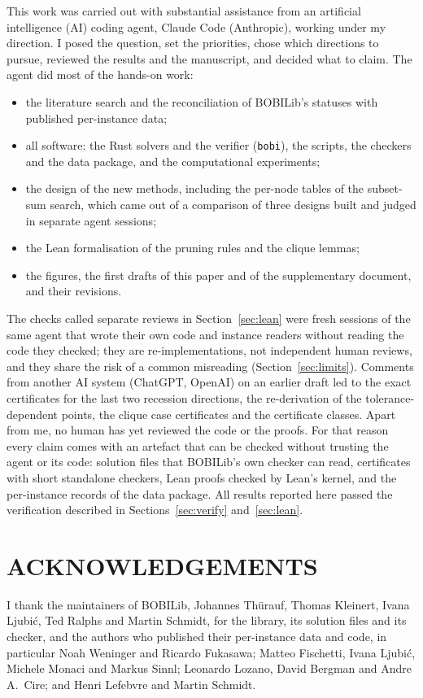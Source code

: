 \documentclass[]{spie}  %
\theoremstyle{plain}
\newcommand{\code}[1]{\texttt{#1}}
\begin{document}
This work was carried out with substantial assistance from an artificial intelligence (AI)
coding agent, Claude Code (Anthropic), working under my direction. I posed the question, set the
priorities, chose which directions to pursue, reviewed the results and the manuscript, and decided
what to claim. The agent did most of the hands-on work:
\begin{itemize}
\item the literature search and the reconciliation of BOBILib's statuses with published
  per-instance data;
\item all software: the Rust solvers and the verifier (\code{bobi}), the scripts, the checkers and
  the data package, and the computational experiments;
\item the design of the new methods, including the per-node tables of the subset-sum search, which
  came out of a comparison of three designs built and judged in separate agent sessions;
\item the Lean formalisation of the pruning rules and the clique lemmas;
\item the figures, the first drafts of this paper and of the supplementary document, and their
  revisions.
\end{itemize}
The checks called separate reviews in Section~\ref{sec:lean} were fresh sessions of the same
agent that wrote their own code and instance readers without reading the code they checked; they
are re-implementations, not independent human reviews, and they share the risk of a common
misreading (Section~\ref{sec:limits}). Comments from another AI system (ChatGPT, OpenAI) on an
earlier draft led to the exact certificates for the last two recession directions, the
re-derivation of the tolerance-dependent points, the clique case certificates and the certificate
classes. Apart from me, no human has yet reviewed the code or the proofs. For that reason every
claim comes with an artefact that can be checked without trusting the agent or its code: solution
files that BOBILib's own checker can read, certificates with short standalone checkers, Lean proofs
checked by Lean's kernel, and the per-instance records of the data package. All results reported
here passed the verification described in Sections~\ref{sec:verify} and~\ref{sec:lean}.

\section*{ACKNOWLEDGEMENTS}

I thank the maintainers of BOBILib, Johannes Th\"urauf, Thomas Kleinert, Ivana
Ljubi\'c, Ted Ralphs and Martin Schmidt, for the library, its solution files and its checker, and
the authors who published their per-instance data and code, in particular Noah Weninger and
Ricardo Fukasawa; Matteo Fischetti, Ivana Ljubi\'c, Michele Monaci and Markus Sinnl; Leonardo
Lozano, David Bergman and Andre A.\ Cire; and Henri Lefebvre and Martin Schmidt.



\end{document}
